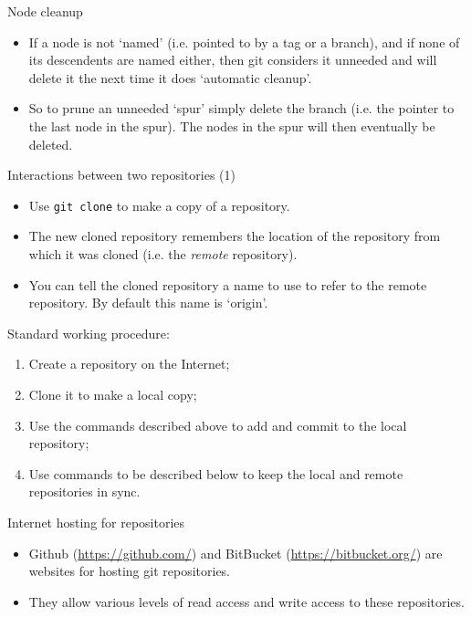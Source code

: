 \documentclass[usenames,dvipsnames]{beamer}
\newcommand{\code}[1]{\colorbox{light-gray}{\texttt{#1}}}
\begin{document}
\begin{frame}{Node cleanup}
  \begin{block}{}
    \begin{itemize}
      \item{If a node is not `named' (i.e. pointed to by a tag or a branch), and if none of its descendents are named either, then git considers it unneeded and will delete it the next time it does `automatic cleanup'.}
      \item{So to prune an unneeded `spur' simply delete the branch (i.e. the pointer to the last node in the spur). The nodes in the spur will then eventually be deleted.}
    \end{itemize}
  \end{block}
\end{frame}

\begin{frame}{Interactions between two repositories (1)}
  \begin{block}{}
    \begin{itemize}
      \item{Use \code{git clone} to make a copy of a repository.}
      \item{The new cloned repository remembers the location of the repository from which it was cloned (i.e. the \textit{remote} repository).}
      \item{You can tell the cloned repository a name to use to refer to the remote repository. By default this name is `origin'.}
    \end{itemize}
  \end{block}
\end{frame}

\begin{frame}{Standard working procedure:}
  \begin{block}{}
    \begin{enumerate}
      \item{Create a repository on the Internet;}
      \item{Clone it to make a local copy;}
      \item{Use the commands described above to add and commit to the local repository;}
      \item{Use commands to be described below to keep the local and remote repositories in sync.}
    \end{enumerate}
  \end{block}
\end{frame}

\begin{frame}{Internet hosting for repositories}
  \begin{block}{}
    \begin{itemize}
      \item{Github (\url{https://github.com/}) and BitBucket (\url{https://bitbucket.org/}) are websites for hosting git repositories.}
      \item{They allow various levels of read access and write access to these repositories.}
    \end{itemize}
  \end{block}
\end{frame}
\end{document}
